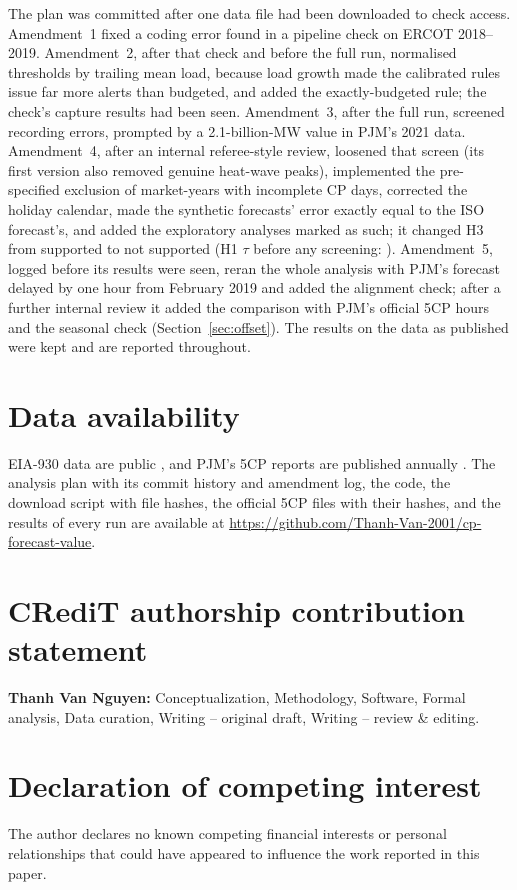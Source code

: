 \documentclass[preprint,12pt,authoryear]{elsarticle}
\newcommand{\repoURL}{https://github.com/Thanh-Van-2001/cp-forecast-value}
\begin{document}
The plan was committed after one data file had been downloaded to check access. Amendment~1 fixed a coding error found in a pipeline check on ERCOT 2018--2019. Amendment~2, after that check and before the full run, normalised thresholds by trailing mean load, because load growth made the calibrated rules issue far more alerts than budgeted, and added the exactly-budgeted rule; the check's capture results had been seen. Amendment~3, after the full run, screened recording errors, prompted by a 2.1-billion-MW value in PJM's 2021 data. Amendment~4, after an internal referee-style review, loosened that screen (its first version also removed genuine heat-wave peaks), implemented the pre-specified exclusion of market-years with incomplete CP days, corrected the holiday calendar, made the synthetic forecasts' error exactly equal to the ISO forecast's, and added the exploratory analyses marked as such; it changed H3 from supported to not supported (H1 $\tau$ before any screening: ). Amendment~5, logged before its results were seen, reran the whole analysis with PJM's forecast delayed by one hour from February 2019 and added the alignment check; after a further internal review it added the comparison with PJM's official 5CP hours and the seasonal check (Section~\ref{sec:offset}). The results on the data as published were kept and are reported throughout.

\section*{Data availability}
EIA-930 data are public \citep{eia930}, and PJM's 5CP reports are published annually \citep{pjm5cp}. The analysis plan with its commit history and amendment log, the code, the download script with file hashes, the official 5CP files with their hashes, and the results of every run are available at \url{\repoURL}.

\section*{CRediT authorship contribution statement}
\textbf{Thanh Van Nguyen:} Conceptualization, Methodology, Software, Formal analysis, Data curation, Writing -- original draft, Writing -- review \& editing.

\section*{Declaration of competing interest}
The author declares no known competing financial interests or personal relationships that could have appeared to influence the work reported in this paper.
\end{document}
